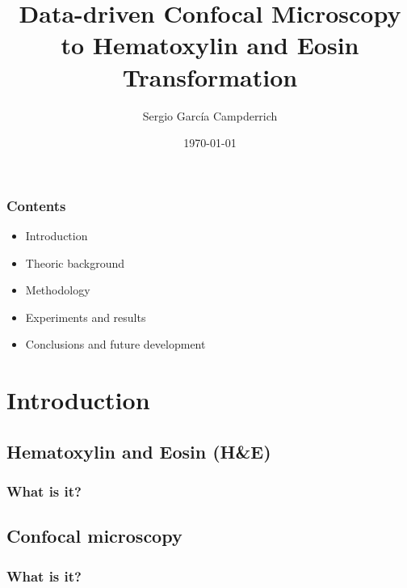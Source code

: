 \documentclass{beamer}
\title{Data-driven Confocal Microscopy to Hematoxylin and Eosin Transformation}
\subtitle{}
\author{Sergio García Campderrich}
\date{\today}
\begin{document}
\maketitle

\begin{frame}
\frametitle{Contents}

\begin{itemize}
\item Introduction\pause
\item Theoric background\pause
\item Methodology\pause
\item Experiments and results\pause
\item Conclusions and future development
\end{itemize}

\end{frame}



\section{Introduction}


\subsection{Hematoxylin and Eosin (H\&E)}

\begin{frame}
\frametitle{What is it?}
\end{frame}

\subsection{Confocal microscopy}

\begin{frame}
\frametitle{What is it?}
\end{frame}
\end{document}

